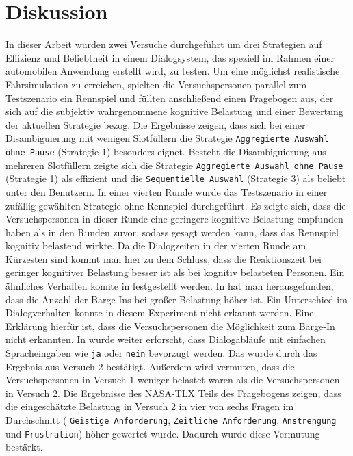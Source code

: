 \documentclass[12pt,a4paper]{scrartcl}
\begin{document}
\section{Diskussion}
\label{discussion}
In dieser Arbeit wurden zwei Versuche durchgeführt um drei Strategien auf Effizienz und Beliebtheit in einem Dialogsystem, das speziell im Rahmen einer automobilen Anwendung erstellt wird, zu testen. Um eine möglichst realistische Fahrsimulation zu erreichen, spielten die Versuchspersonen parallel zum Testszenario ein Rennspiel und füllten anschließend einen Fragebogen aus, der sich auf die subjektiv wahrgenommene kognitive Belastung und einer Bewertung der aktuellen Strategie bezog.
Die Ergebnisse zeigen, dass sich bei einer Disambiguierung mit wenigen Slotfüllern die Strategie \texttt{Aggregierte Auswahl ohne Pause} (Strategie 1) besonders eignet. Besteht die Disambiguierung aus mehreren Slotfüllern zeigte sich die Strategie \texttt{Aggregierte Auswahl ohne Pause} (Strategie 1) als effizient und die \texttt{Sequentielle Auswahl} (Strategie 3) als beliebt unter den Benutzern. \newline \newline
In einer vierten Runde wurde das Testszenario in einer zufällig gewählten Strategie ohne Rennspiel durchgeführt. Es zeigte sich, dass die Versuchspersonen in dieser Runde eine geringere kognitive Belastung empfunden haben als in den Runden zuvor, sodass gesagt werden kann, dass das Rennspiel kognitiv belastend wirkte. Da die Dialogzeiten in der vierten Runde am Kürzesten sind kommt man hier zu dem Schluss, dass die Reaktionszeit bei geringer kognitiver Belastung besser ist als bei kognitiv belasteten Personen. Ein ähnliches Verhalten konnte in \cite{DbCL} festgestellt werden. In \cite{eCLDS} hat man herausgefunden, dass die Anzahl der Barge-Ins bei großer Belastung höher ist. Ein Unterschied im Dialogverhalten konnte in diesem Experiment nicht erkannt werden. Eine Erklärung hierfür ist, dass die Versuchspersonen die Möglichkeit zum Barge-In nicht erkannten. In \cite{eCLDS} wurde weiter erforscht, dass Dialogabläufe mit einfachen Spracheingaben wie \texttt{ja} oder \texttt{nein} bevorzugt werden. Das wurde durch das Ergebnis aus Versuch 2 bestätigt. Außerdem wird vermuten, dass die Versuchspersonen in Versuch 1 weniger belastet waren als die Versuchspersonen in Versuch 2. Die Ergebnisse des NASA-TLX Teils des Fragebogens zeigen, dass die eingeschätzte Belastung in Versuch 2 in vier von sechs Fragen im Durchschnitt ( \texttt{Geistige Anforderung}, \texttt{Zeitliche Anforderung}, \texttt{Anstrengung} und \texttt{Frustration}) höher gewertet wurde. Dadurch wurde diese Vermutung bestärkt. \newline \newline
\end{document}
